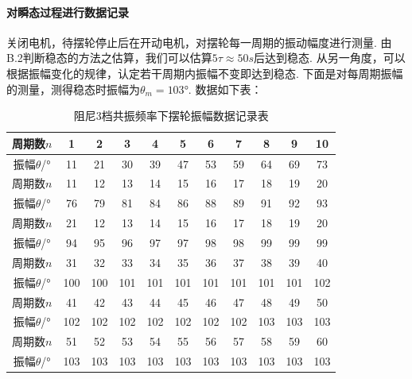 \documentclass[UTF8]{ctexart}
\begin{document}
\paragraph{对瞬态过程进行数据记录}\quad\par
关闭电机，待摆轮停止后在开动电机，对摆轮每一周期的振动幅度进行测量. 由B.2判断稳态的方法之估算，我们可以估算$5\tau\approx50s$后达到稳态. 从另一角度，可以根据振幅变化的规律，认定若干周期内振幅不变即达到稳态. 下面是对每周期振幅的测量，测得稳态时振幅为$\theta_m=103$°. 数据如下表：
\begin{table}[H]{\begin{center}\caption{阻尼3档共振频率下摆轮振幅数据记录表}%
\begin{tabular}[H]{|c|c|c|c|c|c|c|c|c|c|c|}
\hline
周期数$n$&1&2&3&4&5&6&7&8&9&10\\
\hline
振幅$\theta$/°&11&21&30&39&47&53&59&64&69&73\\
\hline
周期数$n$&11&12&13&14&15&16&17&18&19&20\\
\hline
振幅$\theta$/°&76&79&81&84&86&88&89&91&92&93\\
\hline
周期数$n$&21&12&13&14&15&16&17&18&19&20\\
\hline
振幅$\theta$/°&94&95&96&97&97&98&98&99&99&99\\
\hline
周期数$n$&31&32&33&34&35&36&37&38&39&40\\
\hline
振幅$\theta$/°&100&100&101&101&101&101&101&101&101&102\\
\hline
周期数$n$&41&42&43&44&45&46&47&48&49&50\\
\hline
振幅$\theta$/°&102&102&102&102&102&102&102&103&103&103\\
\hline
周期数$n$&51&52&53&54&55&56&57&58&59&60\\
\hline
振幅$\theta$/°&103&103&103&103&103&103&103&103&103&103\\
\hline
\end{tabular}%
\label{zunisandang}
\end{center}}\end{table}
\end{document}
